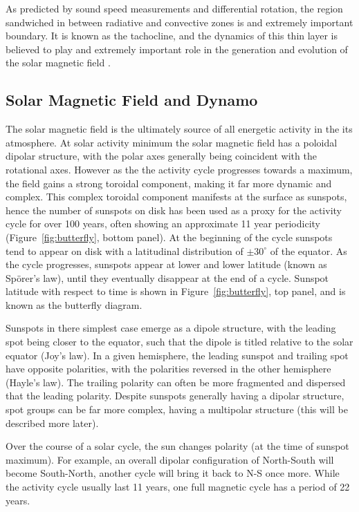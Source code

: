 As predicted by sound speed measurements and differential rotation, the region sandwiched in between radiative and convective zones is and extremely important boundary. It is known as the tachocline, and the dynamics of this thin layer is believed to play and extremely important role in the generation and evolution of the solar magnetic field \citep{thompson2003}.




\subsection{Solar Magnetic Field and Dynamo}\label{sec:11}

The solar magnetic field is the ultimately source of all energetic activity in the its atmosphere. At solar activity minimum the solar magnetic field has a poloidal dipolar structure, with the polar axes generally being coincident with the rotational axes. However as the the activity cycle progresses towards a maximum, the field gains a strong toroidal component, making it far more dynamic and complex. This complex toroidal component manifests at the surface as sunspots, hence the number of sunspots on disk has been used as a proxy for the activity cycle for over 100 years, often showing an approximate 11 year periodicity (Figure~\ref{fig:butterfly}, bottom panel). At the beginning of the cycle sunspots tend to appear on disk with a latitudinal distribution of $\pm30^{\circ}$ of the equator. As the cycle progresses, sunspots appear at lower and lower latitude (known as Sp\"{o}rer's law), until they eventually disappear at the end of a cycle. Sunspot latitude with respect to time is shown in Figure~\ref{fig:butterfly}, top panel, and is known as the butterfly diagram.

Sunspots in there simplest case emerge as a dipole structure, with the leading spot being closer to the equator, such that the dipole is titled relative to the solar equator (Joy's law). In a given hemisphere, the leading sunspot and trailing spot have opposite polarities, with the polarities reversed in the other hemisphere  (Hayle's law). The trailing polarity can often be more fragmented and dispersed that the leading polarity. Despite sunspots generally having a dipolar structure, spot groups can be far more complex, having a multipolar structure (this will be described more later).

Over the course of a solar cycle, the sun changes polarity (at the time of sunspot maximum). For example, an overall dipolar configuration of North-South will become South-North, another cycle will bring it back to N-S once more. While the activity cycle usually last 11 years, one full magnetic cycle has a period of 22 years.


